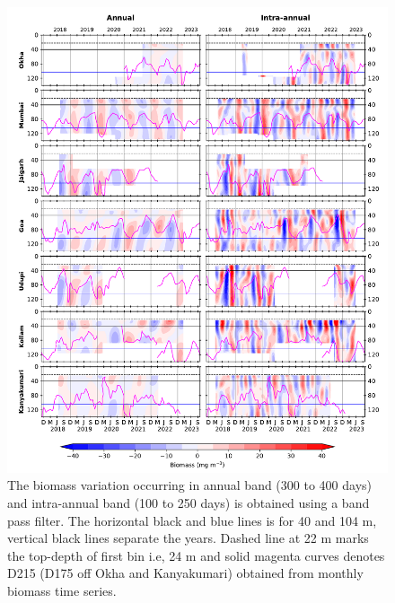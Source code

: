 \documentclass[12pt,a4paper]{article}
\begin{document}
\begin{figure}[htbp]
	\centering
	\includegraphics[width=\textwidth]{./figures/filtered_biomass_annual_intraannual.pdf} 
	\caption{The biomass variation occurring in annual band (300 to 400 days) and intra-annual band (100 to 250 days) is obtained using a band pass filter. The horizontal black and blue lines is for 40 and 104 m, vertical black lines separate the years. Dashed line at 22 m marks the top-depth of first bin i.e, 24 m and solid magenta curves denotes D215 (D175 off Okha and Kanyakumari) obtained from monthly biomass time series.}
	\label{fig:intraannual_annual}
\end{figure}

\end{document}
